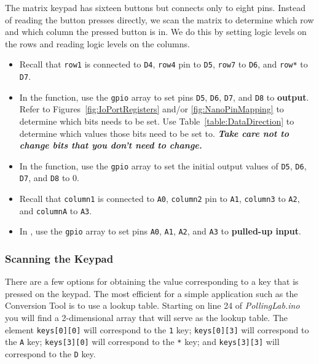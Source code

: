 The matrix keypad has sixteen buttons but connects only to eight pins. Instead
of reading the button presses directly, we scan the matrix to determine
which row and which column the pressed button is in. We do this by setting
logic levels on the rows and reading logic levels on the columns.

    \begin{itemize}
    \item Recall that \texttt{row1} is connected to \texttt{D4}, \texttt{row4}
        pin to \texttt{D5}, \texttt{row7} to \texttt{D6}, and \texttt{row*} to
        \texttt{D7}.
    \item In the  function, use the \lstinline{gpio}
        array to set pins \texttt{D5}, \texttt{D6}, \texttt{D7}, and
        \texttt{D8} to \textbf{output}. Refer to
        Figures~\ref{fig:IoPortRegisters} and/or \ref{fig:NanoPinMapping} to
        determine which bits needs to be set. Use
        Table~\ref{table:DataDirection} to determine which values those bits
        need to be set to. \textbf{\textit{Take care not to change bits that
        you don't need to change.}}
    \item In the  function, use the \lstinline{gpio}
        array to set the initial output values of \texttt{D5}, \texttt{D6},
        \texttt{D7}, and \texttt{D8} to 0.
    \item Recall that \texttt{column1} is connected to \texttt{A0},
        \texttt{column2} pin to \texttt{A1}, \texttt{column3} to \texttt{A2},
        and \texttt{columnA} to \texttt{A3}.
    \item In , use the \lstinline{gpio} array to
        set pins \texttt{A0}, \texttt{A1}, \texttt{A2}, and \texttt{A3} to
        \textbf{pulled-up input}.
    \end{itemize}

\subsubsection{Scanning the Keypad}

There are a few options for obtaining the value corresponding to a key that is
pressed on the keypad. The most efficient for a simple application such as the
Conversion Tool is to use a lookup table. Starting on line 24 of
\textit{PollingLab.ino} you will find a 2-dimensional array that will serve as
the lookup table. The element \lstinline{keys[0][0]} will correspond to the
\texttt{1} key; \lstinline{keys[0][3]} will correspond to the \texttt{A} key;
\lstinline{keys[3][0]} will correspond to the \texttt{*} key; and
\lstinline{keys[3][3]} will correspond to the \texttt{D} key.

